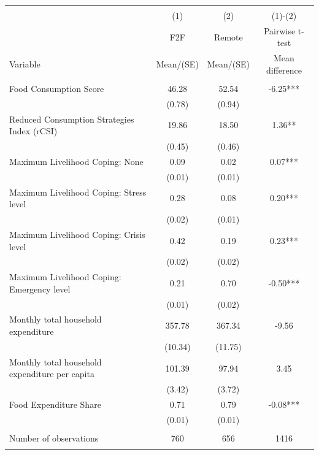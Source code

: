 
\begin{tabular}{@{\extracolsep{5pt}}lccc}
\\[-1.8ex]\hline \hline \\[-1.8ex]
 & \multicolumn{1}{c}{(1)}  & \multicolumn{1}{c}{(2)}  & \multicolumn{1}{c}{(1)-(2)} \\
 & \multicolumn{1}{c}{F2F}  & \multicolumn{1}{c}{Remote}  & \multicolumn{1}{c}{Pairwise t-test}  \\
Variable & Mean/(SE) & Mean/(SE) & Mean difference \\ \hline \\[-1.8ex] 
Food Consumption Score   & 46.28    & 52.54    & -6.25***   \\
 & (0.78)  & (0.94)  &  \\ [1ex]
Reduced Consumption Strategies Index (rCSI)   & 19.86    & 18.50    & 1.36**   \\
 & (0.45)  & (0.46)  &  \\ [1ex]
Maximum Livelihood Coping: None   & 0.09    & 0.02    & 0.07***   \\
 & (0.01)  & (0.01)  &  \\ [1ex]
Maximum Livelihood Coping: Stress level   & 0.28    & 0.08    & 0.20***   \\
 & (0.02)  & (0.01)  &  \\ [1ex]
Maximum Livelihood Coping: Crisis level   & 0.42    & 0.19    & 0.23***   \\
 & (0.02)  & (0.02)  &  \\ [1ex]
Maximum Livelihood Coping: Emergency level   & 0.21    & 0.70    & -0.50***   \\
 & (0.01)  & (0.02)  &  \\ [1ex]
Monthly total household expenditure   & 357.78    & 367.34    & -9.56   \\
 & (10.34)  & (11.75)  &  \\ [1ex]
Monthly total household expenditure per capita   & 101.39    & 97.94    & 3.45   \\
 & (3.42)  & (3.72)  &  \\ [1ex]
Food Expenditure Share   & 0.71    & 0.79    & -0.08***   \\
 & (0.01)  & (0.01)  &  \\ [1ex]
\hline \\[-1.8ex]
Number of observations  & 760   & 656  & 1416  \\
\hline \hline \\[-1.8ex]

\end{tabular}
